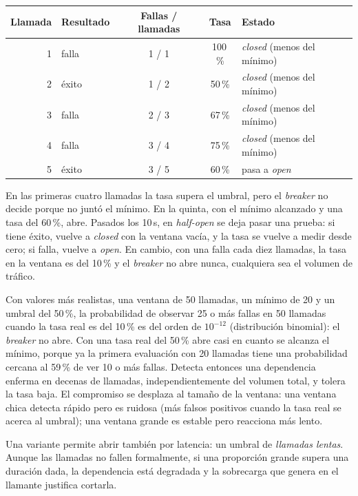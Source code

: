 \documentclass[variant=apuntes,cover=institutional,mode=screen]{ua-engineering-v6-article}
\begin{document}
\begin{center}
\begin{tabular}{rlccl}
\toprule
\textbf{Llamada} & \textbf{Resultado} & \textbf{Fallas / llamadas} & \textbf{Tasa} & \textbf{Estado} \\
\midrule
1 & falla & 1 / 1 & 100\,\% & \emph{closed} (menos del mínimo) \\
2 & éxito & 1 / 2 & 50\,\% & \emph{closed} (menos del mínimo) \\
3 & falla & 2 / 3 & 67\,\% & \emph{closed} (menos del mínimo) \\
4 & falla & 3 / 4 & 75\,\% & \emph{closed} (menos del mínimo) \\
5 & éxito & 3 / 5 & 60\,\% & pasa a \emph{open} \\
\bottomrule
\end{tabular}
\end{center}

En las primeras cuatro llamadas la tasa supera el umbral, pero el \emph{breaker} no decide porque no juntó el mínimo. En la quinta, con el mínimo alcanzado y una tasa del 60\,\%, abre. Pasados los 10\,s, en \emph{half-open} se deja pasar una prueba: si tiene éxito, vuelve a \emph{closed} con la ventana vacía, y la tasa se vuelve a medir desde cero; si falla, vuelve a \emph{open}. En cambio, con una falla cada diez llamadas, la tasa en la ventana es del 10\,\% y el \emph{breaker} no abre nunca, cualquiera sea el volumen de tráfico.

Con valores más realistas, una ventana de 50 llamadas, un mínimo de 20 y un umbral del 50\,\%, la probabilidad de observar 25 o más fallas en 50 llamadas cuando la tasa real es del 10\,\% es del orden de $10^{-12}$ (distribución binomial): el \emph{breaker} no abre. Con una tasa real del 50\,\% abre casi en cuanto se alcanza el mínimo, porque ya la primera evaluación con 20 llamadas tiene una probabilidad cercana al 59\,\% de ver 10 o más fallas. Detecta entonces una dependencia enferma en decenas de llamadas, independientemente del volumen total, y tolera la tasa baja. El compromiso se desplaza al tamaño de la ventana: una ventana chica detecta rápido pero es ruidosa (más falsos positivos cuando la tasa real se acerca al umbral); una ventana grande es estable pero reacciona más lento.

Una variante permite abrir también por latencia: un umbral de \emph{llamadas lentas}. Aunque las llamadas no fallen formalmente, si una proporción grande supera una duración dada, la dependencia está degradada y la sobrecarga que genera en el llamante justifica cortarla.
\end{document}
